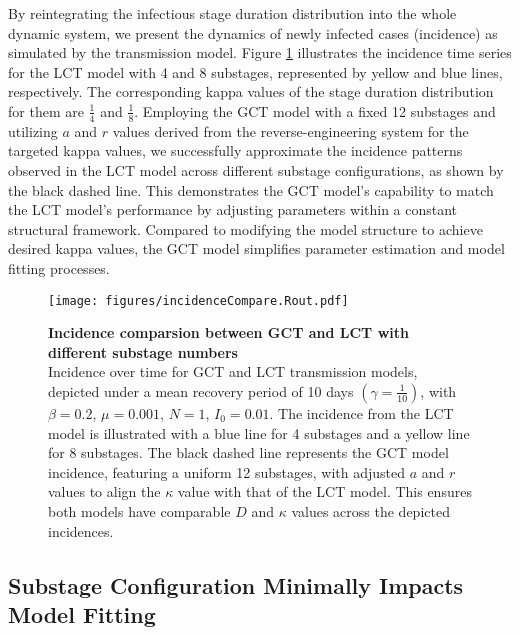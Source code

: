 \documentclass[12pt]{article}
\begin{document}
By reintegrating the infectious stage duration distribution into the whole dynamic system, we present the dynamics of newly infected cases (incidence) as simulated by the transmission model. Figure \ref{incidenceCompare} illustrates the incidence time series for the LCT model with 4 and 8 substages, represented by yellow and blue lines, respectively. The corresponding kappa values of the stage duration distribution for them are $\frac{1}{4}$ and $\frac{1}{8}$. Employing the GCT model with a fixed 12 substages and utilizing $a$ and $r$ values derived from the reverse-engineering system for the targeted kappa values, we successfully approximate the incidence patterns observed in the LCT model across different substage configurations, as shown by the black dashed line. This demonstrates the GCT model's capability to match the LCT model's performance by adjusting parameters within a constant structural framework. Compared to modifying the model structure to achieve desired kappa values, the GCT model simplifies parameter estimation and model fitting processes. 

\begin{figure}[h!]
    \centering
    \texttt{[image: figures/incidenceCompare.Rout.pdf]}
    \caption{\textbf{Incidence comparsion between GCT and LCT with different substage numbers} \\ Incidence over time for GCT and LCT transmission models, depicted under a mean recovery period of 10 days $(\gamma = \frac{1}{10})$, with $\beta=0.2$, $\mu=0.001$, $N=1$, $I_0=0.01$. The incidence from the LCT model is illustrated with a blue line for 4 substages and a yellow line for 8 substages. The black dashed line represents the GCT model incidence, featuring a uniform 12 substages, with adjusted $a$ and $r$ values to align the $\kappa$ value with that of the LCT model. This ensures both models have comparable $D$ and $\kappa$ values across the depicted incidences.}
    \label{incidenceCompare}
\end{figure}


\subsection{Substage Configuration Minimally Impacts Model Fitting}
\end{document}
